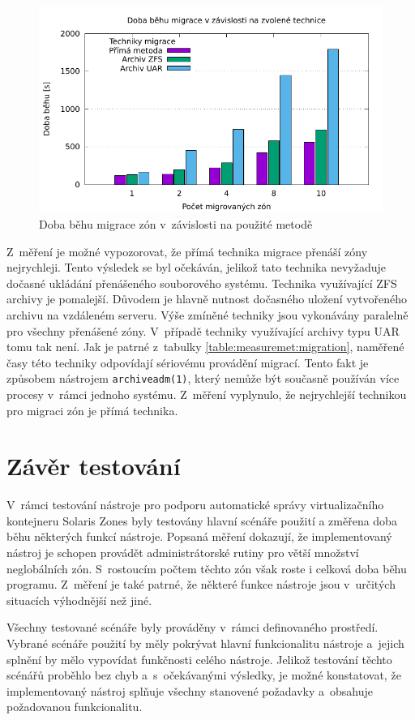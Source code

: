 \begin{figure}
  \centering
  \label{graph:measuremet:migration}
  \includegraphics{assets/pdfs/measurement_migration.pdf}
  \caption{Doba běhu migrace zón v~závislosti na použité metodě}
\end{figure}

Z~měření je možné vypozorovat, že přímá technika migrace přenáší zóny nejrychleji. Tento výsledek se byl očekáván, jelikož tato technika nevyžaduje
dočasné ukládání přenášeného souborového systému. Technika využívající ZFS archivy je pomalejší. Důvodem je hlavně nutnost
dočasného uložení vytvořeného archivu na vzdáleném serveru. Výše zmíněné techniky jsou vykonávány paralelně pro všechny přenášené
zóny. V~případě techniky využívající archivy typu UAR tomu tak není. Jak je patrné z~tabulky \ref{table:measuremet:migration},
naměřené časy této techniky odpovídají sériovému provádění migrací. Tento fakt je způsobem nástrojem \verb|archiveadm(1)|, který
nemůže být současně používán více procesy v~rámci jednoho systému. Z~měření vyplynulo, že nejrychlejší technikou pro migraci zón je
přímá technika.
\section{Závěr testování}
\label{chapter:testing:scenario:conclusion}
V~rámci testování nástroje pro podporu automatické správy virtualizačního kontejneru Solaris Zones byly testovány hlavní scénáře
použití a změřena doba běhu některých funkcí nástroje. Popsaná měření dokazují, že implementovaný nástroj je schopen provádět administrátorské
rutiny pro větší množství neglobálních zón. S~rostoucím počtem těchto zón však roste i celková doba běhu programu. Z~měření je také patrné,
že některé funkce nástroje jsou v~určitých situacích výhodnější než jiné.

Všechny testované scénáře byly prováděny v~rámci definovaného prostředí.
Vybrané scénáře použití by měly pokrývat hlavní funkcionalitu nástroje a~jejich splnění by mělo
vypovídat funkčnosti celého nástroje. Jelikož testování těchto scénářů proběhlo bez chyb a~s~očekávanými výsledky, je možné konstatovat,
že implementovaný nástroj splňuje všechny stanovené požadavky a~obsahuje požadovanou funkcionalitu.

